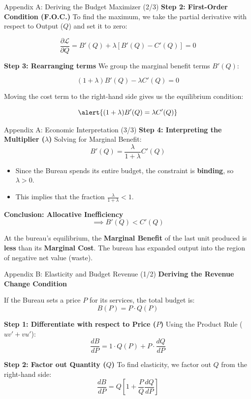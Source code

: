 \documentclass[10pt]{beamer}
\begin{document}
\begin{frame}{Appendix A: Deriving the Budget Maximizer (2/3)}
\textbf{Step 2: First-Order Condition (F.O.C.)}
To find the maximum, we take the partial derivative with respect to Output ($Q$) and set it to zero:

\[
\frac{\partial \mathcal{L}}{\partial Q} = B'(Q) + \lambda [ B'(Q) - C'(Q) ] = 0
\]

\vspace{0.3cm}

\textbf{Step 3: Rearranging terms}
We group the marginal benefit terms $B'(Q)$:

\[
(1 + \lambda) B'(Q) - \lambda C'(Q) = 0
\]

Moving the cost term to the right-hand side gives us the equilibrium condition:

\[
\alert{(1 + \lambda) B'(Q) = \lambda C'(Q)}
\]

\end{frame}


\begin{frame}{Appendix A: Economic Interpretation (3/3)}
\textbf{Step 4: Interpreting the Multiplier ($\lambda$)}
Solving for Marginal Benefit:
\[
B'(Q) = \frac{\lambda}{1 + \lambda} C'(Q)
\]

\begin{itemize}
\item Since the Bureau spends its entire budget, the constraint is \textbf{binding}, so $\lambda > 0$.
\item This implies that the fraction $\frac{\lambda}{1+\lambda} < 1$.
\end{itemize}

\vspace{0.3cm}

\textbf{Conclusion: Allocative Inefficiency}
\[
\implies B'(Q) < C'(Q)
\]

At the bureau's equilibrium, the \textbf{Marginal Benefit} of the last unit produced is \textbf{less} than its \textbf{Marginal Cost}. The bureau has expanded output into the region of negative net value (waste).
\end{frame}

\begin{frame}{Appendix B: Elasticity and Budget Revenue (1/2)}
\textbf{Deriving the Revenue Change Condition}

If the Bureau sets a price $P$ for its services, the total budget is:
\[
B(P) = P \cdot Q(P)
\]

\textbf{Step 1: Differentiate with respect to Price ($P$)}
Using the Product Rule ($uv' + vu'$):
\[
\frac{dB}{dP} = 1 \cdot Q(P) + P \cdot \frac{dQ}{dP}
\]

\textbf{Step 2: Factor out Quantity ($Q$)}
To find elasticity, we factor out $Q$ from the right-hand side:
\[
\frac{dB}{dP} = Q \left[ 1 + \frac{P}{Q} \frac{dQ}{dP} \right]
\]

\end{frame}
\end{document}
